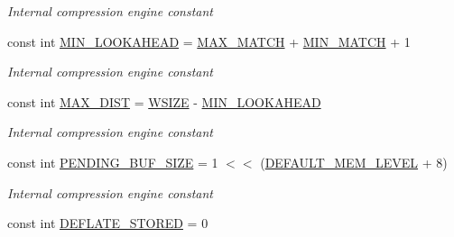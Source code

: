 \begin{DoxyCompactItemize}
\begin{DoxyCompactList}\small\item\em Internal compression engine constant \end{DoxyCompactList}\item 
const int \hyperlink{class_i_c_sharp_code_1_1_sharp_zip_lib_1_1_zip_1_1_compression_1_1_deflater_constants_a46dce966677f8bdf692f4ea3cf2eb934}{M\+I\+N\+\_\+\+L\+O\+O\+K\+A\+H\+E\+AD} = \hyperlink{class_i_c_sharp_code_1_1_sharp_zip_lib_1_1_zip_1_1_compression_1_1_deflater_constants_a3deccd8f717e4457bbc48df1549aa9b7}{M\+A\+X\+\_\+\+M\+A\+T\+CH} + \hyperlink{class_i_c_sharp_code_1_1_sharp_zip_lib_1_1_zip_1_1_compression_1_1_deflater_constants_afbb20dd9ee7a8034ad9158319a185a17}{M\+I\+N\+\_\+\+M\+A\+T\+CH} + 1
\begin{DoxyCompactList}\small\item\em Internal compression engine constant \end{DoxyCompactList}\item 
const int \hyperlink{class_i_c_sharp_code_1_1_sharp_zip_lib_1_1_zip_1_1_compression_1_1_deflater_constants_a0bcf04f094e22f5d8c4a7a5ed368b3b3}{M\+A\+X\+\_\+\+D\+I\+ST} = \hyperlink{class_i_c_sharp_code_1_1_sharp_zip_lib_1_1_zip_1_1_compression_1_1_deflater_constants_a3e1ad9d347115b6c72aefea84127174d}{W\+S\+I\+ZE} -\/ \hyperlink{class_i_c_sharp_code_1_1_sharp_zip_lib_1_1_zip_1_1_compression_1_1_deflater_constants_a46dce966677f8bdf692f4ea3cf2eb934}{M\+I\+N\+\_\+\+L\+O\+O\+K\+A\+H\+E\+AD}
\begin{DoxyCompactList}\small\item\em Internal compression engine constant \end{DoxyCompactList}\item 
const int \hyperlink{class_i_c_sharp_code_1_1_sharp_zip_lib_1_1_zip_1_1_compression_1_1_deflater_constants_ab3f16a4d73df46efebf60f13b65e431a}{P\+E\+N\+D\+I\+N\+G\+\_\+\+B\+U\+F\+\_\+\+S\+I\+ZE} = 1 $<$$<$ (\hyperlink{class_i_c_sharp_code_1_1_sharp_zip_lib_1_1_zip_1_1_compression_1_1_deflater_constants_adedc568bd79ed8001d1de9c93b751033}{D\+E\+F\+A\+U\+L\+T\+\_\+\+M\+E\+M\+\_\+\+L\+E\+V\+EL} + 8)
\begin{DoxyCompactList}\small\item\em Internal compression engine constant \end{DoxyCompactList}\item 
const int \hyperlink{class_i_c_sharp_code_1_1_sharp_zip_lib_1_1_zip_1_1_compression_1_1_deflater_constants_a41d422d7b68226111ea6da5c0799ca98}{D\+E\+F\+L\+A\+T\+E\+\_\+\+S\+T\+O\+R\+ED} = 0
$$
\end{DoxyCompactItemize}
